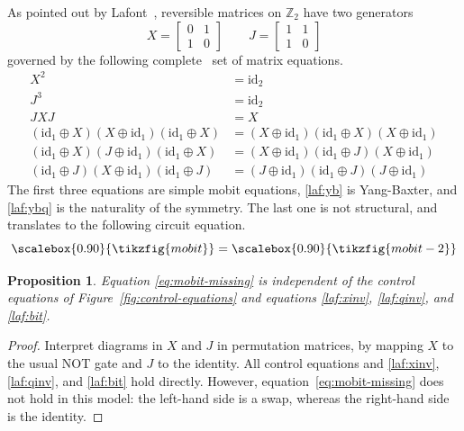 \documentclass[a4paper]{article}
\theoremstyle{plain}
\newtheorem{proposition}[theorem]{Proposition}
\theoremstyle{definition}
\newcommand{\tf}[1]{\scalebox{0.90}{\tikzfig{#1}}}
\newcommand{\Z}{{\mathbb Z}}
\newcommand{\iid}{\mathrm{id}}
\begin{document}
As pointed out by Lafont~\cite{lafont2003}, reversible matrices on $\Z_2$ have
two generators
\[
	X = \begin{bmatrix} 0 & 1 \\ 1 & 0 \end{bmatrix}
	\qquad
	J = \begin{bmatrix} 1 & 1 \\ 1 & 0 \end{bmatrix}
\]
governed by the following complete~\cite[Theorem 6]{lafont2003} set of
matrix equations.
\begin{align}
	\label{laf:xinv} X^2 &= \iid_2 \\
	\label{laf:qinv} J^3 &= \iid_2 \\
	\label{laf:bit} JXJ &= X \\
	\label{laf:yb} (\iid_1 {\oplus} X)(X {\oplus} \iid_1)(\iid_1 {\oplus} X)
	&= (X {\oplus} \iid_1)(\iid_1 {\oplus} X)(X {\oplus} \iid_1) \\
	\label{laf:ybq} (\iid_1 {\oplus} X)(J {\oplus} \iid_1)(\iid_1 {\oplus} X)
	&= (X {\oplus} \iid_1)(\iid_1 {\oplus} J)(X {\oplus} \iid_1) \\
	\label{laf:ybqqq} (\iid_1 {\oplus} J)(X {\oplus} \iid_1)(\iid_1 {\oplus} J)
	&= (J {\oplus} \iid_1)(\iid_1 {\oplus} J)(J {\oplus} \iid_1)
\end{align}
The first three equations are simple mobit equations, \eqref{laf:yb} is
Yang-Baxter, and \eqref{laf:ybq} is the naturality of the symmetry. The last one is
not structural, and translates to the following circuit equation.
\begin{equation}
	\label{eq:mobit-missing}
	\tf{mobit}
	=
	\tf{mobit-2}
\end{equation}

\begin{proposition}
	Equation \eqref{eq:mobit-missing} is independent of the control equations
	of Figure~\ref{fig:control-equations} and equations \eqref{laf:xinv},
	\eqref{laf:qinv}, and \eqref{laf:bit}.
\end{proposition}
\begin{proof}
	Interpret diagrams in $X$ and $J$ in permutation matrices, by mapping
	$X$ to the usual NOT gate and $J$ to the identity. All control equations
	and \eqref{laf:xinv}, \eqref{laf:qinv}, and \eqref{laf:bit} hold directly.
	However, equation~\eqref{eq:mobit-missing} does not hold in this model: the
	left-hand side is a swap, whereas the right-hand side is
	the identity.
\end{proof}
\end{document}

